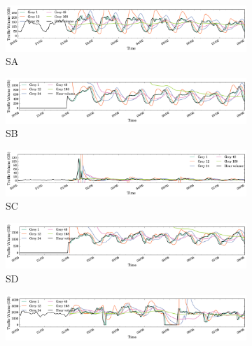 \begin{figure}
\centering
		\centering
		\begin{subfigure}[b]{0.9\textwidth}
                \includegraphics[width=\textwidth]{gfx/chap2/grey_sa.png}
                \caption{SA}
                \label{fig:grey_sa}
        \end{subfigure}
        \begin{subfigure}[b]{0.9\textwidth}
                \includegraphics[width=\textwidth]{gfx/chap2/grey_sb.png}
                \caption{SB}
                \label{fig:grey_sb}
        \end{subfigure}
        \begin{subfigure}[b]{0.9\textwidth}
                \includegraphics[width=\textwidth]{gfx/chap2/grey_sc.png}
                \caption{SC}
                \label{fig:grey_sc}
        \end{subfigure}
        \begin{subfigure}[b]{0.9\textwidth}
                \includegraphics[width=\textwidth]{gfx/chap2/grey_sd.png}
                \caption{SD}
                \label{fig:grey_sd}
        \end{subfigure}
        \begin{subfigure}[b]{0.9\textwidth}
                \includegraphics[width=\textwidth]{gfx/chap2/grey_se.png}

\end{subfigure}
\end{figure}

